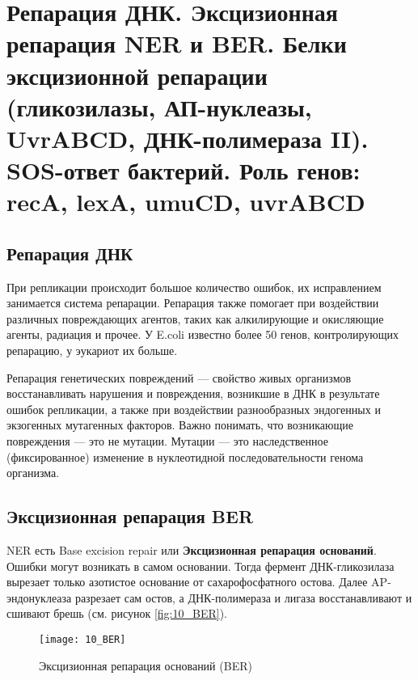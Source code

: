 \section{Репарация ДНК. Эксцизионная репарация NER и BER. Белки эксцизионной репарации (гликозилазы, АП-нуклеазы, UvrABCD, ДНК-полимераза II). SOS-ответ бактерий. Роль генов: recA, lexA, umuCD, uvrABCD}

\subsection{Репарация ДНК}

При репликации происходит большое количество ошибок, их исправлением занимается система репарации. Репарация также помогает при воздействии различных повреждающих агентов, таких как алкилирующие и окисляющие агенты, радиация и прочее. У E.coli известно более 50 генов, контролирующих репарацию, у эукариот их больше. 

Репарация генетических повреждений --- свойство живых организмов восстанавливать нарушения и повреждения, возникшие в ДНК в результате ошибок репликации, а также при воздействии разнообразных эндогенных и экзогенных мутагенных факторов. Важно понимать, что возникающие повреждения --- это не мутации. Мутации --- это наследственное (фиксированное) изменение в нуклеотидной последовательности генома организма.



\subsection{Эксцизионная репарация BER}

NER есть Base excision repair или \textbf{Эксцизионная репарация оснований}. Ошибки могут возникать в самом основании. Тогда фермент ДНК-гликозилаза вырезает только азотистое основание от сахарофосфатного остова. Далее AP-эндонуклеаза разрезает сам остов, а ДНК-полимераза и лигаза восстанавливают и сшивают брешь (см. рисунок \ref{fig:10_BER}).

\begin{figure}[H]
	\centering
	\texttt{[image: 10\_BER]}
	\caption{Эксцизионная репарация оснований (BER)}
	\label{fig:10_NER}
\end{figure}

